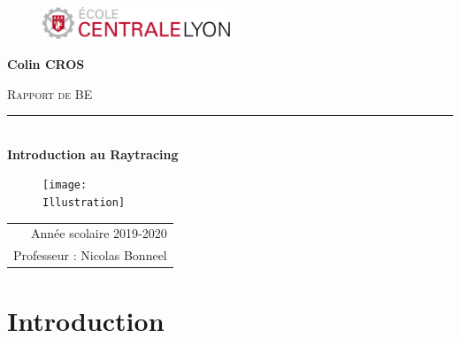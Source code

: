 \documentclass[12pt,a4paper,twoside]{report}
\newcommand{\Surtitre}{Rapport de BE}
\newcommand{\TitreRapport}{\textbf{Introduction au Raytracing}}
\newcommand{\DateStage}{Année scolaire 2019-2020}
\newcommand{\Eleve}{Colin CROS}
\newcommand{\Professeur}{Nicolas Bonneel}
\newcommand{\Illustration}{illustration}
\begin{document}
	


\thispagestyle{empty} %
\noindent %


\begin{center}

	\begin{figure}[H]
	\includegraphics[width=0.5\textwidth]{centrale_lyon}
	\end{figure}
	\vspace{5\baselineskip}
	
	\begin{center}
	{\Large \textbf{\Eleve}} \\ 
	\end{center}
	
	\vfill
	
	{\Large \textsc{\Surtitre}} \\
	\rule{9.5cm}{0.2pt} \\ %
	\vspace{1\baselineskip} %
	{\LARGE \TitreRapport}
	\begin{figure}[H]
	\centering
	\texttt{[image: \\Illustration]}
	\end{figure}

	
	\vfill
	\begin{table}[h!]
		\centering
		\begin{tabular}{r} %
		\DateStage \\
		Professeur : \Professeur\\
		\end{tabular}
	\end{table}
			
\end{center}

\newpage

\newpage\section*{Introduction}
\end{document}
